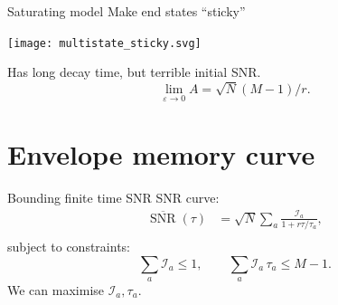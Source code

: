 \documentclass{beamer}%
\DeclareMathOperator{\snr}{SNR}
\newcommand{\snrb}{\overline{\snr}}
\newcommand{\initial}{\mathcal{I}}
\renewcommand{\e}{\mathsf{e}}
\begin{document}

\begin{frame}{Saturating model}
%
 Make end states ``sticky''
 \begin{center}
   \texttt{[image: multistate\_sticky.svg]}
 \end{center}
 Has long decay time, but terrible initial SNR.
 \begin{equation*}
   \lim_{\varepsilon\to0}A=\sqrt{N}(M-1)/r.
 \end{equation*}
%
\end{frame}



\section{Envelope memory curve}


\begin{frame}{Bounding finite time SNR}
%
 SNR curve:
 \begin{equation*}
  \begin{aligned}
   \snrb(\tau) &= \sqrt{N}\sum_a \frac{\initial_a }{1+r\tau/\tau_a}, \\
 \end{aligned}
 \end{equation*}
 subject to constraints:
 \begin{equation*}
   \sum_a \initial_a \leq 1,
   \qquad
   \sum_a \initial_a\, \tau_a \leq M-1.
 \end{equation*}
 We can maximise \wrt $\initial_a,\tau_a$.
%
\end{frame}
\end{document}
